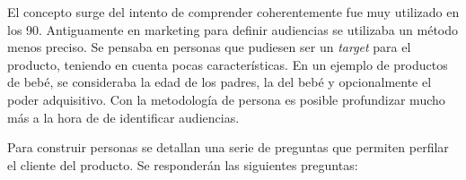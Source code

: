 El concepto surge del intento de comprender coherentemente fue muy utilizado en los 90. Antiguamente en marketing para definir audiencias se utilizaba un método menos preciso. Se pensaba en personas que pudiesen ser un \emph{target} para el producto, teniendo en cuenta pocas características. En un ejemplo de productos de bebé, se consideraba la edad de los padres, la del bebé y opcionalmente el poder adquisitivo. Con la metodología de persona es posible profundizar mucho más a la hora de de identificar audiencias.\cite{persona2019}

Para construir personas se detallan una serie de preguntas que permiten perfilar el cliente del producto. Se responderán las siguientes preguntas:
